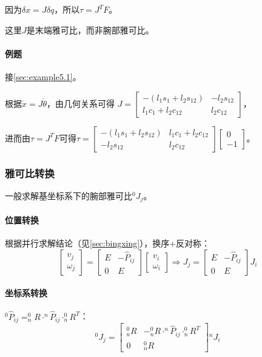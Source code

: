 \documentclass[
12pt, %
a4paper, 
oneside, %
headinclude,footinclude, %
]{scrartcl}
\begin{document}
因为$ \delta x = J \delta q $，所以$ \tau = J^T F $。

这里$ J $是末端雅可比，而非腕部雅可比。
\paragraph{例题}\label{sec:example5.2}
接\ref{sec:example5.1}。

根据$ \dot{x} = J \dot{\theta} $，由几何关系可得
$ J = \begin{bmatrix} -(l_1 s_1 + l_2 s_{12}) & -l_2 s_{12} \\ l_1 c_1 + l_2 c_{12} & l_2 c_{12} \end{bmatrix} $，

进而由$ \tau = J^T F $可得$ \tau = \begin{bmatrix} -(l_1 s_1 + l_2 s_{12}) & l_1 c_1 + l_2 c_{12} \\ - l_2 s_{12} & l_2 c_{12} \end{bmatrix} \begin{bmatrix} 0 \\ -1 \end{bmatrix} $。
\subsubsection{雅可比转换}
一般求解基坐标系下的腕部雅可比$ ^0 J_j $。
\paragraph{位置转换}
根据并行求解结论（见\ref{sec:bingxing}），换序+反对称：
$$ 
\begin{bmatrix} v_j \\ \omega_j \end{bmatrix} 
=
\begin{bmatrix} E & -\hat{P}_{ij} \\ 0 & E \end{bmatrix}
\begin{bmatrix} v_i \\ \omega_i \end{bmatrix} 
\Rightarrow 
J_j = \begin{bmatrix} E & -\hat{P}_{ij} \\ 0 & E \end{bmatrix} J_i
$$ 
\paragraph{坐标系转换}
$ ^0\hat{P}_{ij} = ^0_n R \cdot ^n\hat{P}_{ij} \cdot ^0_n R^T $：
$$ ^0 J_j = \begin{bmatrix} ^0_n R & -^0_n R \cdot ^n\hat{P}_{ij} \cdot ^0_n R^T \\ 0 & ^0_n R \end{bmatrix} {}^n J_i $$
\end{document}
